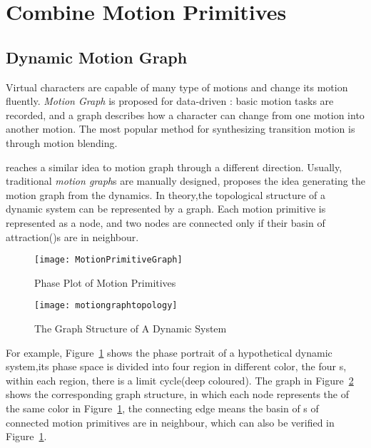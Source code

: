 \section{Combine Motion Primitives}
\label{sec:manyprimitive}

\subsection{Dynamic Motion Graph}
Virtual characters are capable of many type of motions and change its motion fluently.
\emph{Motion Graph}\citep{kovar2008motion} is proposed for data-driven \cms:
basic motion tasks are recorded, and a graph describes how a character can change from one motion into another motion. 
The most popular method for synthesizing transition motion is through motion blending.


\moit reaches a similar idea to motion graph through a different direction.
Usually, traditional \emph{motion graph}s are manually designed, \moit proposes the idea generating the motion graph from the dynamics.
In theory,the topological structure of a dynamic system can be represented by a  graph.
Each motion primitive is represented as a node, and two nodes are connected only if their basin of attraction(\boa)s are in neighbour.

\begin{figure}[!htbp]
  \begin{center}
	\texttt{[image: MotionPrimitiveGraph]}
    \caption{Phase Plot of Motion Primitives}
    \label{fig:manyprimitives}
  \end{center}
\end{figure}


\begin{figure}[!htbp]
  \begin{center}
      \texttt{[image: motiongraphtopology]}
    \caption{The Graph Structure of A Dynamic System}
    \label{fig:manyprimitivesgraph}
  \end{center}
\end{figure}

For example, Figure~\ref{fig:manyprimitives} shows the phase portrait of a hypothetical dynamic system,its phase space is divided into four region in different color, the four \boa s, within each region, there is a limit cycle(deep coloured).
The graph in Figure~\ref{fig:manyprimitivesgraph} shows the corresponding graph structure, in which each node represents the \boa of the same color in Figure~\ref{fig:manyprimitives}, the connecting edge means the basin of {\boa}s of connected motion primitives are in neighbour, which can also be verified in Figure~\ref{fig:manyprimitives}.


